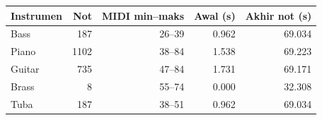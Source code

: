 \begin{tabular}{lrrrr}
\toprule
Instrumen & Not & MIDI min--maks & Awal (s) & Akhir not (s) \\
\midrule
Bass & 187 & 26--39 & 0.962 & 69.034 \\
Piano & 1102 & 38--84 & 1.538 & 69.223 \\
Guitar & 735 & 47--84 & 1.731 & 69.171 \\
Brass & 8 & 55--74 & 0.000 & 32.308 \\
Tuba & 187 & 38--51 & 0.962 & 69.034 \\
\bottomrule
\end{tabular}

